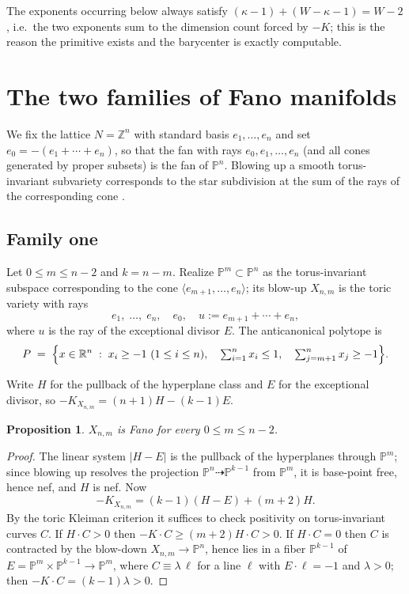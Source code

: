 \documentclass[11pt]{amsart}
\newtheorem{proposition}[theorem]{Proposition}
\theoremstyle{definition}
\theoremstyle{remark}
\newcommand{\PP}{\mathbb{P}}
\newcommand{\RR}{\mathbb{R}}
\newcommand{\ZZ}{\mathbb{Z}}
\begin{document}
The exponents occurring below always satisfy
$(\kappa-1)+(W-\kappa-1)=W-2$, i.e.\ the two exponents sum to the
dimension count forced by $-K$; this is the reason the primitive
exists and the barycenter is exactly computable.

\section{The two families of Fano manifolds}\label{sec:toric}

We fix the lattice $N=\ZZ^n$ with standard basis $e_1,\dots,e_n$ and
set $e_0=-(e_1+\cdots+e_n)$, so that the fan with rays
$e_0,e_1,\dots,e_n$ (and all cones generated by proper subsets) is the
fan of $\PP^n$. Blowing up a smooth torus-invariant subvariety
corresponds to the star subdivision at the sum of the rays of the
corresponding cone \cite[\S3.3]{CLS11}.

\subsection{Family one}\label{subsec:famA}
Let $0\le m\le n-2$ and $k=n-m$. Realize $\PP^m\subset\PP^n$ as the
torus-invariant subspace corresponding to the cone
$\langle e_{m+1},\dots,e_n\rangle$; its blow-up $X_{n,m}$ is the toric
variety with rays
\[
e_1,\;\dots,\;e_n,\quad e_0,\quad
u:=e_{m+1}+\cdots+e_n ,
\]
where $u$ is the ray of the exceptional divisor $E$. The anticanonical
polytope is
\begin{equation}\label{eq:PA}
P\;=\;\Bigl\{x\in\RR^n\;:\;
x_i\ge-1\ (1\le i\le n),\quad
\textstyle\sum_{i=1}^n x_i\le 1,\quad
\textstyle\sum_{j=m+1}^{n}x_j\ge-1\Bigr\}.
\end{equation}

Write $H$ for the pullback of the hyperplane class and $E$ for the
exceptional divisor, so $-K_{X_{n,m}}=(n+1)H-(k-1)E$.

\begin{proposition}\label{prop:famA-fano}
$X_{n,m}$ is Fano for every $0\le m\le n-2$.
\end{proposition}

\begin{proof}
The linear system $|H-E|$ is the pullback of the hyperplanes through
$\PP^m$; since blowing up resolves the projection
$\PP^n\dashrightarrow\PP^{k-1}$ from $\PP^m$, it is base-point free,
hence nef, and $H$ is nef. Now
\[
-K_{X_{n,m}}=(k-1)(H-E)+(m+2)H .
\]
By the toric Kleiman criterion \cite[Theorem 6.3.13]{CLS11} it
suffices to check positivity on torus-invariant curves $C$. If
$H\cdot C>0$ then $-K\cdot C\ge (m+2)H\cdot C>0$. If $H\cdot C=0$ then
$C$ is contracted by the blow-down $X_{n,m}\to\PP^n$, hence lies in a
fiber $\PP^{k-1}$ of $E=\PP^m\times\PP^{k-1}\to\PP^m$, where
$C\equiv\lambda\,\ell$ for a line $\ell$ with $E\cdot\ell=-1$ and
$\lambda>0$; then $-K\cdot C=(k-1)\lambda>0$.
\end{proof}
\end{document}
